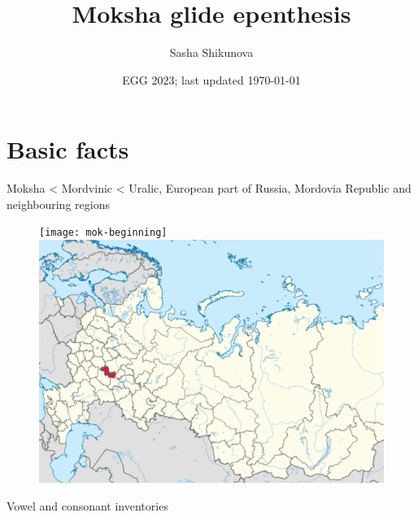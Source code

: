 \documentclass[a4paper, 12pt]{article}
\title{Moksha glide epenthesis}
\author{Sasha Shikunova}
\date{EGG 2023; last updated \today}
\begin{document}
\maketitle

	\section{Basic facts}
	
	Moksha < Mordvinic < Uralic, European part of Russia, Mordovia Republic and neighbouring regions
	
	\begin{figure}[H]
		\centering
		\texttt{[image: mok-beginning]}
		\hfill
		\includegraphics[scale=.373]{mok-map}
	\end{figure}
	
	\noindent Vowel and consonant inventories \parencite{kukhto2018}
	
\end{document}
